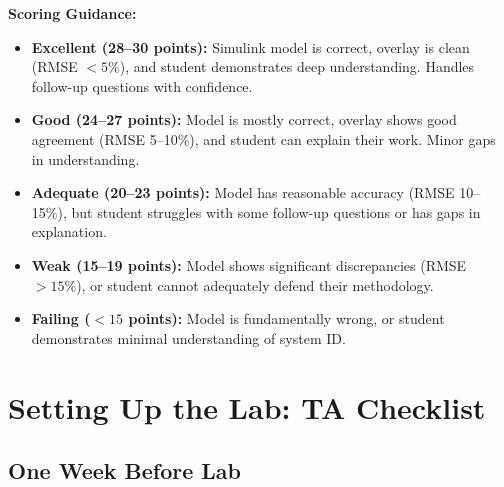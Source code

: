 \documentclass[11pt,letterpaper]{article}
\begin{document}
\noindent
\textbf{Scoring Guidance:}

\begin{itemize}
    \item \textbf{Excellent (28--30 points):} Simulink model is correct, overlay is clean (RMSE $< 5\%$), and student demonstrates deep understanding. Handles follow-up questions with confidence.

    \item \textbf{Good (24--27 points):} Model is mostly correct, overlay shows good agreement (RMSE 5--10\%), and student can explain their work. Minor gaps in understanding.

    \item \textbf{Adequate (20--23 points):} Model has reasonable accuracy (RMSE 10--15\%), but student struggles with some follow-up questions or has gaps in explanation.

    \item \textbf{Weak (15--19 points):} Model shows significant discrepancies (RMSE $> 15\%$), or student cannot adequately defend their methodology.

    \item \textbf{Failing ($< 15$ points):} Model is fundamentally wrong, or student demonstrates minimal understanding of system ID.
\end{itemize}

\section{Setting Up the Lab: TA Checklist}

\subsection{One Week Before Lab}
\end{document}
